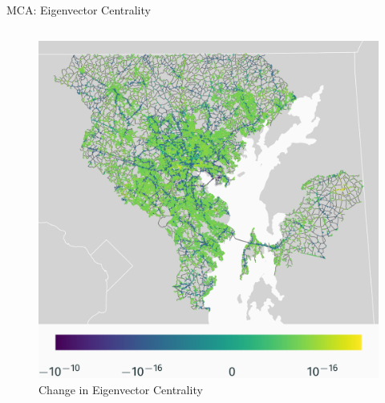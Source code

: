 \documentclass{beamer}
\numberwithin{figure}{section} %
\numberwithin{table}{section} %
\begin{document}
\begin{frame}{MCA: Eigenvector Centrality}
\begin{columns}
        \begin{column}{0.33\textwidth}
            \begin{figure}
                \centering
                \includegraphics[width=\textwidth]{maps/eigenvector_diff.png}
                {\scriptsize Change in Eigenvector Centrality}
            \end{figure}
        \end{column}
    \end{columns}
\end{frame}
\end{document}
